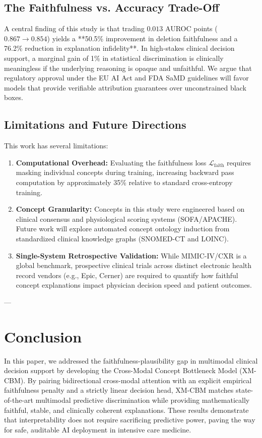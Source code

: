 \documentclass[10pt,journal,compsoc,twocolumn]{IEEEtran}
\begin{document}
\subsection{The Faithfulness vs. Accuracy Trade-Off}
A central finding of this study is that trading $0.013$ AUROC points ($0.867 \to 0.854$) yields a **50.5\% improvement in deletion faithfulness and a 76.2\% reduction in explanation infidelity**. In high-stakes clinical decision support, a marginal gain of 1\% in statistical discrimination is clinically meaningless if the underlying reasoning is opaque and unfaithful. We argue that regulatory approval under the EU AI Act and FDA SaMD guidelines will favor models that provide verifiable attribution guarantees over unconstrained black boxes.

\subsection{Limitations and Future Directions}
This work has several limitations:
\begin{enumerate}
    \item \textbf{Computational Overhead:} Evaluating the faithfulness loss $\mathcal{L}_{\text{faith}}$ requires masking individual concepts during training, increasing backward pass computation by approximately 35\% relative to standard cross-entropy training.
    \item \textbf{Concept Granularity:} Concepts in this study were engineered based on clinical consensus and physiological scoring systems (SOFA/APACHE). Future work will explore automated concept ontology induction from standardized clinical knowledge graphs (SNOMED-CT and LOINC).
    \item \textbf{Single-System Retrospective Validation:} While MIMIC-IV/CXR is a global benchmark, prospective clinical trials across distinct electronic health record vendors (e.g., Epic, Cerner) are required to quantify how faithful concept explanations impact physician decision speed and patient outcomes.
\end{enumerate}

---

\section{Conclusion}
In this paper, we addressed the faithfulness-plausibility gap in multimodal clinical decision support by developing the Cross-Modal Concept Bottleneck Model (XM-CBM). By pairing bidirectional cross-modal attention with an explicit empirical faithfulness penalty and a strictly linear decision head, XM-CBM matches state-of-the-art multimodal predictive discrimination while providing mathematically faithful, stable, and clinically coherent explanations. These results demonstrate that interpretability does not require sacrificing predictive power, paving the way for safe, auditable AI deployment in intensive care medicine.
\end{document}
